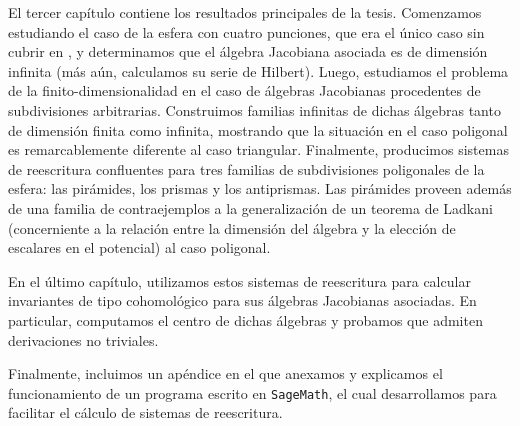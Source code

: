 \begin{chapter}
El tercer capítulo contiene los resultados principales de la tesis. Comenzamos estudiando el caso de la esfera con cuatro punciones, que era el único caso sin cubrir en \cite{Lad12}, y determinamos que el álgebra Jacobiana asociada es de dimensión infinita (más aún, calculamos su serie de Hilbert). Luego, estudiamos el problema de la finito-dimensionalidad en el caso de álgebras Jacobianas procedentes de subdivisiones arbitrarias. Construimos familias infinitas de dichas álgebras tanto de dimensión finita como infinita, mostrando que la situación en el caso poligonal es remarcablemente diferente al caso triangular. Finalmente, producimos sistemas de reescritura confluentes para tres familias de subdivisiones poligonales de la esfera: las pirámides, los prismas y los antiprismas. Las pirámides proveen además de una familia de contraejemplos a la generalización de un teorema de Ladkani (concerniente a la relación entre la dimensión del álgebra y la elección de escalares en el potencial) al caso poligonal.

En el último capítulo, utilizamos estos sistemas de reescritura para calcular invariantes de tipo cohomológico para sus álgebras Jacobianas asociadas. En particular, computamos el centro de dichas álgebras y probamos que admiten derivaciones no triviales.

Finalmente, incluimos un apéndice en el que anexamos y explicamos el funcionamiento de un programa escrito en \texttt{SageMath}, el cual desarrollamos para facilitar el cálculo de sistemas de reescritura.
\end{chapter}